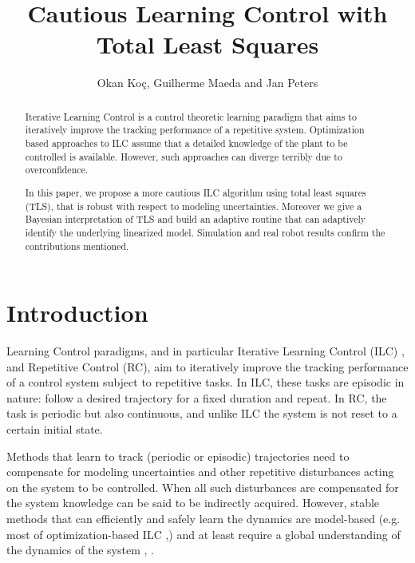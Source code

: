 \documentclass[10pt,a4paper]{article}
\author{Okan Ko\c c, Guilherme Maeda and Jan Peters}
\title{Cautious Learning Control with Total Least Squares}
\begin{document}
\maketitle
\thispagestyle{empty}
\pagestyle{empty}

\begin{abstract}

Iterative Learning Control is a control theoretic learning paradigm that aims to iteratively improve the tracking performance of a repetitive system. Optimization based approaches to ILC assume that a detailed knowledge of the plant to be controlled is available. However, such approaches can diverge terribly due to overconfidence. 

In this paper, we propose a more cautious ILC algorithm using total least squares (TLS), that is robust with respect to modeling uncertainties. Moreover we give a Bayesian interpretation of TLS and build an adaptive routine that can adaptively identify the underlying linearized model. Simulation and real robot results confirm the contributions mentioned.
\end{abstract}



\section{Introduction}

Learning Control paradigms, and in particular Iterative Learning Control (ILC) \cite{Arimoto84}, \cite{Bristow06} and Repetitive Control (RC), aim to iteratively improve the tracking performance of a control system subject to repetitive tasks. In ILC, these tasks are episodic in nature: follow a desired trajectory for a fixed duration and repeat. In RC, the task is periodic but also continuous, and unlike ILC the system is not reset to a certain initial state. 

Methods that learn to track (periodic or episodic) trajectories need to compensate for modeling uncertainties and other repetitive disturbances acting on the system to be controlled. When all such disturbances are compensated for the system knowledge can be said to be indirectly acquired. However, stable methods that can efficiently and safely learn the dynamics are model-based (e.g. most of optimization-based ILC \cite{Amann95},\cite{Bristow06}) and at least require a global understanding of the dynamics of the system \cite{Kolter09}, \cite{NguyenTuong11}.
\end{document}
